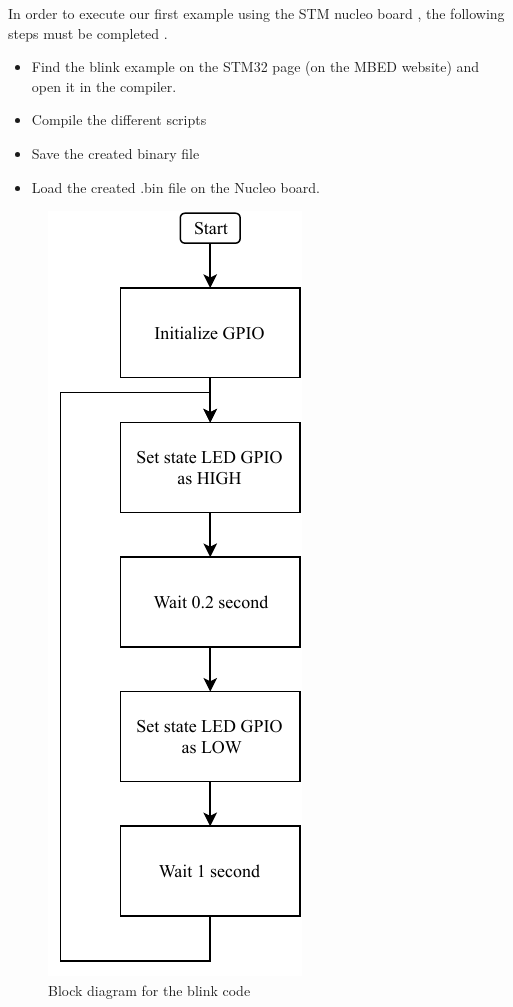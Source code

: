 \documentclass[a4paper, 11pt, openany, oneside]{book}
\newcommand{\inputmintedcpp}[1]{
\inputminted[style=fruity,%
             linenos=true,
             firstnumber=1,
             bgcolor=black, %
]
{cpp}
{#1}
}
\begin{document}
In order to execute our first example using the STM nucleo board , the following steps must be completed .



\begin{itemize}
    \item Find the blink example on the STM32 page (on the MBED website) and open it in the compiler. 
    \item Compile the different scripts 
    \item Save the created binary file
    \item Load the created .bin file on the Nucleo board.
\end{itemize}
\newpage




\begin{figure}
\centering
\includegraphics{mbed_blink_diag.pdf}
\caption{Block diagram for the blink code}
\end{figure}
\end{document}
